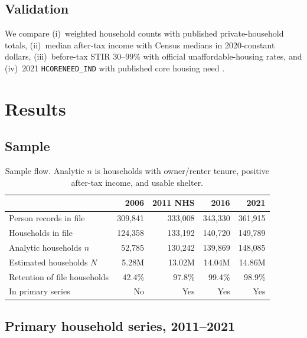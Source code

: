 \documentclass[11pt,letterpaper]{article}
\begin{document}
\subsection{Validation}

We compare (i)~weighted household counts with published private-household totals, (ii)~median after-tax income with Census medians in 2020-constant dollars, (iii)~before-tax STIR $30$--$99\%$ with official unaffordable-housing rates, and (iv)~2021 \texttt{HCORENEED\_IND} with published core housing need \cite{statcan2022daily}.

\section{Results}
\label{sec:results}

\subsection{Sample}

\begin{table}[ht]
\centering
\caption{Sample flow. Analytic $n$ is households with owner/renter tenure, positive after-tax income, and usable shelter.}
\label{tab:flow}
\small
\begin{tabular}{lrrrr}
\toprule
 & 2006 & 2011 NHS & 2016 & 2021 \\
\midrule
Person records in file & 309,841 & 333,008 & 343,330 & 361,915 \\
Households in file & 124,358 & 133,192 & 140,720 & 149,789 \\
Analytic households $n$ & 52,785 & 130,242 & 139,869 & 148,085 \\
Estimated households $N$ & 5.28M & 13.02M & 14.04M & 14.86M \\
Retention of file households & 42.4\% & 97.8\% & 99.4\% & 98.9\% \\
In primary series & No & Yes & Yes & Yes \\
\bottomrule
\end{tabular}
\end{table}

\subsection{Primary household series, 2011--2021}
\end{document}
